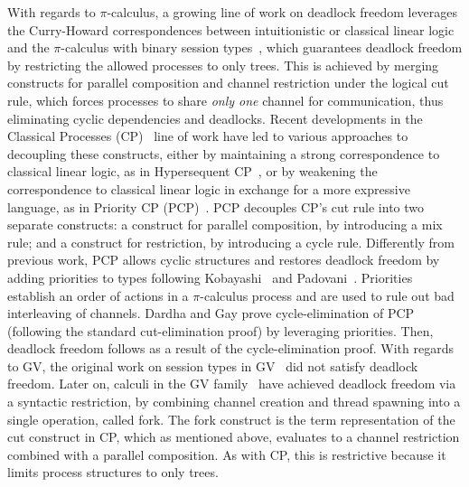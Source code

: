 \documentclass[main.tex]{subfiles}
\begin{document}
With regards to $\pi$-calculus, a growing line of work on deadlock freedom leverages the Curry-Howard correspondences between intuitionistic or classical linear logic and the $\pi$-calculus with binary session types~\cite{cairespfenning10,wadler14}, which guarantees deadlock freedom by restricting the allowed processes to only trees. This is achieved by merging constructs for parallel composition and channel restriction under the logical cut rule, which forces processes to share \emph{only one} channel for communication, thus eliminating cyclic dependencies and deadlocks. Recent developments in the Classical Processes (CP)~\cite{wadler14} line of work have led to various approaches to decoupling these constructs, either by maintaining a strong correspondence to classical linear logic, as in Hypersequent CP~\cite{kokkemontesi19popl,kokkemontesi19tlla}, or by weakening the correspondence to classical linear logic in exchange for a more expressive language, as in Priority CP (PCP)~\cite{dardhagay18}. PCP decouples CP's cut rule into two separate constructs: a construct for parallel composition, by introducing a mix rule; and a construct for restriction, by introducing a cycle rule. Differently from previous work, PCP allows cyclic structures and restores deadlock freedom by adding priorities to types following Kobayashi~\cite{kobayashi06} and Padovani~\cite{padovani14}. Priorities establish an order of actions in a $\pi$-calculus process and are used to rule out bad interleaving of channels. Dardha and Gay prove cycle-elimination of PCP (following the standard cut-elimination proof) by leveraging priorities. Then, deadlock freedom follows as a result of the cycle-elimination proof.
%
With regards to GV, the original work on session types in GV~\cite{gayvasconcelos12} did not satisfy deadlock freedom. Later on, calculi in the GV family~\cite{wadler15,lindleymorris15} have achieved deadlock freedom via a syntactic restriction, \ie by combining channel creation and thread spawning into a single operation, called fork. The fork construct is the term representation of the cut construct in CP, which as mentioned above, evaluates to a channel restriction combined with a parallel composition. As with CP, this is restrictive because it limits process structures to only trees.
\end{document}
